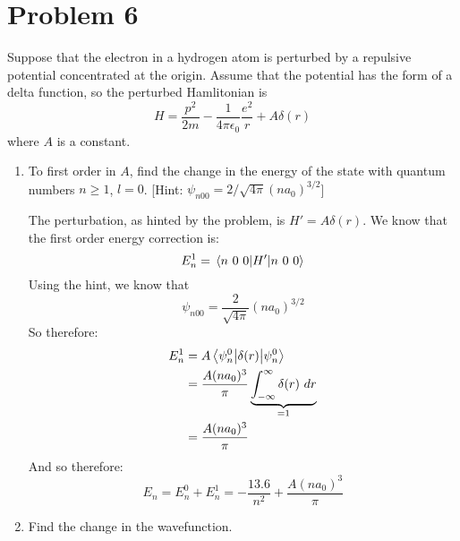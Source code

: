 \documentclass[10pt]{article}
\begin{document}
    \section*{Problem 6}
    Suppose that the electron in a hydrogen atom is perturbed by a repulsive potential concentrated at the origin. Assume that the potential has the form of a delta function, so the perturbed Hamlitonian is
    \[ H = \frac{p^2}{2m} - \frac{1}{4\pi \epsilon_0} \frac{e^2}{r} + A\delta(r)\] 
    where $A$ is a constant. 
    \begin{enumerate}[label=(\alph*)]
        \item To first order in $A$, find the change in the energy of the state with quantum numbers $n \ge 1$, $l = 0$. [Hint: $\psi_{n00} = 2/\sqrt{4\pi}(na_0)^{3/2}$]
        
        \begin{solution}
            The perturbation, as hinted by the problem, is $H' = A\delta(r)$. We know that the first order energy correction is:
            \[ E_n^1 = \expval{H'}{n\ 0 \ 0}\]
            Using the hint, we know that 
            \[ \psi_{n00} = \frac{2}{\sqrt{4\pi}} (na_0)^{3/2}\]
            So therefore: 
            \begin{align*}
                E_n^1 &= A\expval{\delta(r)}{\psi_n^0}\\
                &= \frac{A(na_0)^3}{\pi} \underbrace{\int_{-\infty}^\infty \delta(r) \ dr}_{= 1} \\
                &= \frac{A(na_0)^3}{\pi}
            \end{align*}
            And so therefore: 
            \[ E_n = E_n^0 + E_n^1 = -\frac{13.6}{n^2} + \frac{A(na_0)^3}{\pi}\]
        \end{solution}
        \item Find the change in the wavefunction.


\end{enumerate}
\end{document}
